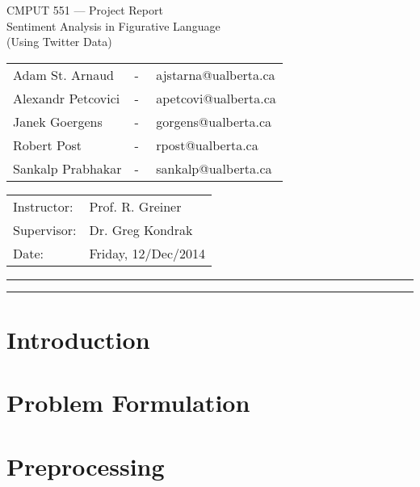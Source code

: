 \documentclass[12pt]{article}
\date{}
\begin{document}
\begin{center}\Large
        CMPUT 551 --- Project Report\\
        Sentiment Analysis in Figurative Language\\
        \tiny (Using Twitter Data)\\
        \vspace{0.30in}
        \small
        \begin{tabular}{@{}ll}
        Adam St. Arnaud &-~~ ajstarna@ualberta.ca\\
        Alexandr Petcovici &-~~ apetcovi@ualberta.ca\\
        Janek Goergens &-~~ gorgens@ualberta.ca\\
        Robert Post &-~~ rpost@ualberta.ca\\
        Sankalp Prabhakar &-~~ sankalp@ualberta.ca\\
        \end{tabular}
        
\end{center}
\begin{tabular}{@{}ll}
Instructor: & Prof. R. Greiner \\
Supervisor: & Dr. Greg Kondrak\\
Date: & Friday, 12/Dec/2014
\end{tabular}


\hrule\hrule

\vspace{0.20in}
\tableofcontents


\newpage
\section{Introduction} %
\label{sec:introduction}


\newpage
\section{Problem Formulation} %
\label{sec:problem_formulation}


\newpage
\section{Preprocessing} %
\label{sec:preprocessing}


\newpage
\end{document}
